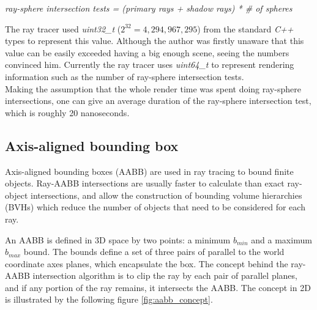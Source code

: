 \documentclass{article}
\begin{document}
\centerline{\textit{ray-sphere intersection tests = (primary rays + shadow rays) * \# of spheres}}

The ray tracer used \textit{uint32\_t} ($2^{32} = 4,294,967,295$) from the standard \textit{C++} types to represent this value. Although the author was firstly unaware that this value can be easily exceeded having a big enough scene, seeing the numbers convinced him. Currently the ray tracer uses \textit{uint64\_t} to represent rendering information such as the number of ray-sphere intersection tests. \\
Making the assumption that the whole render time was spent doing ray-sphere intersections, one can give an average duration of the ray-sphere intersection test, which is roughly 20 nanoseconds. 

\subsection{Axis-aligned bounding box}

Axis-aligned bounding boxes (AABB) are used in ray tracing to bound finite objects. Ray-AABB intersections are usually faster to calculate than exact ray-object intersections, and allow the construction of bounding volume hierarchies (BVHs) which reduce the number of objects that need to be considered for each ray. \cite{aabb} \\

\vspace*{\baselineskip}

An AABB is defined in 3D space by two points: a minimum $b_{min}$ and a maximum $b_{max}$ bound. The bounds define a set of three pairs of parallel to the world coordinate axes planes, which encapsulate the box. The concept behind the ray-AABB intersection algorithm is to clip the ray by each pair of parallel planes, and if any portion of the ray remains, it intersects the AABB. The concept in 2D is illustrated by the following figure \ref{fig:aabb_concept}.
\end{document}
